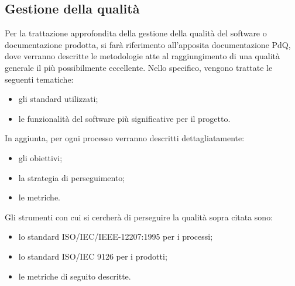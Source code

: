 \subsection{Gestione della qualità}
Per la trattazione approfondita della gestione della qualità del software o documentazione prodotta, si farà riferimento all’apposita documentazione PdQ, dove verranno descritte le metodologie atte al raggiungimento di una qualità generale il più possibilmente eccellente. Nello specifico, vengono trattate le seguenti tematiche:
\begin{itemize}
	\item gli standard utilizzati;
	\item le funzionalità del software più significative per il progetto. 
\end{itemize}
In aggiunta, per ogni processo verranno descritti dettagliatamente:
\begin{itemize}
	\item gli obiettivi;
	\item la strategia di perseguimento;
	\item le metriche.
\end{itemize}
Gli strumenti con cui si cercherà di perseguire la qualità sopra citata sono:
\begin{itemize}
	\item lo standard ISO/IEC/IEEE-12207:1995 per i processi;
	\item lo standard ISO/IEC 9126 per i prodotti;
	\item le metriche di seguito descritte.
\end{itemize}

